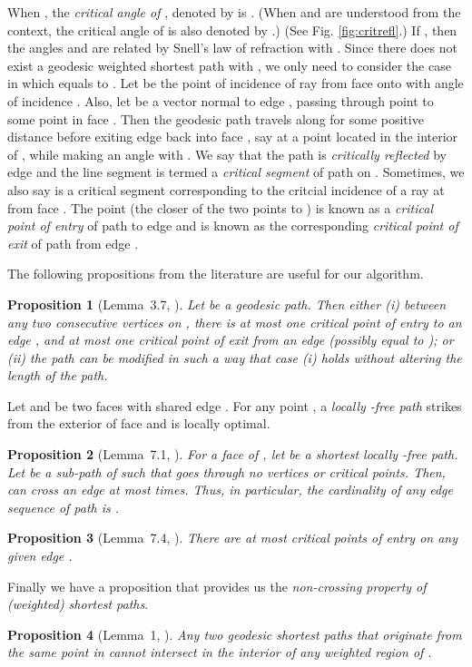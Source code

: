 \documentclass[11pt]{article}
\newtheorem{propo}{Proposition}
\begin{document}
When , the {\it critical angle of }, denoted by  is .
(When  and  are understood from the context, the critical angle of  is also denoted by .)
(See Fig. \ref{fig:critrefl}.)
If , then the angles  and  are related by Snell's law of refraction with .
Since there does not exist a geodesic weighted shortest path with , we only need to consider the case in which  equals to . 
Let  be the point of incidence of ray  from face  onto  with angle of incidence .
Also, let  be a vector normal to edge , passing through point  to some point in face .
Then the geodesic path travels along  for some positive distance before exiting edge  back into face , say at a point  located in the interior of , while making an angle  with . 
We say that the path  is {\it critically reflected} by edge  and the line segment  is termed a {\it critical segment} of path  on .
Sometimes, we also say  is a critical segment corresponding to the critcial incidence of a ray at  from face .
The point  (the closer of the two points  to ) is known as a {\it critical point of entry} of path  to edge  and  is known as the corresponding {\it critical point of exit} of path  from edge .

The following propositions from the literature are useful for our algorithm.

\begin{propo}[Lemma~3.7, \cite{journals/jacm/MitchellP91}]
\label{prop:betwcrit}
Let  be a geodesic path.
Then either (i) between any two consecutive vertices on , there is at most one critical point of entry to an edge , and at most one critical point of exit from an edge  (possibly equal to ); or
(ii) the path  can be modified in such a way that case (i) holds without altering the length of the path. 
\end{propo}

Let  and  be two faces with shared edge .
For any point , a {\it locally -free path} strikes  from the exterior of face  and is locally optimal.

\begin{propo}[Lemma~7.1, \cite{journals/jacm/MitchellP91}]
\label{prop:edgeseqlen}
For a face  of , let  be a shortest locally -free path.
Let  be a sub-path of  such that  goes through no vertices or critical points.
Then,  can cross an edge  at most  times.
Thus, in particular, the cardinality of any edge sequence of path  is .
\end{propo}

\begin{propo}[Lemma~7.4, \cite{journals/jacm/MitchellP91}]
\label{prop:numcritsrc}
There are at most  critical points of entry on any given edge .
\end{propo}
Finally we have a  proposition that provides us the {\it non-crossing property of (weighted) shortest paths}.
\begin{propo}[Lemma~1, \cite{journals/jal/SunR06}]
\label{prop:noncrossing}
Any two geodesic shortest paths that originate from the same point in  cannot intersect in the interior of any weighted region of .
\end{propo}
\end{document}

